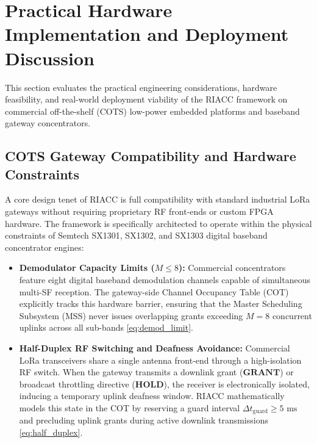 \documentclass[preprint,review,12pt]{elsarticle}
\begin{document}
\section{Practical Hardware Implementation and Deployment Discussion}
\label{sec:discussion}

This section evaluates the practical engineering considerations, hardware feasibility, and real-world deployment viability of the RIACC framework on commercial off-the-shelf (COTS) low-power embedded platforms and baseband gateway concentrators.

\subsection{COTS Gateway Compatibility and Hardware Constraints}
A core design tenet of RIACC is full compatibility with standard industrial LoRa gateways without requiring proprietary RF front-ends or custom FPGA hardware. The framework is specifically architected to operate within the physical constraints of Semtech SX1301, SX1302, and SX1303 digital baseband concentrator engines:
\begin{itemize}
    \item \textbf{Demodulator Capacity Limits ($M \le 8$):} Commercial concentrators feature eight digital baseband demodulation channels capable of simultaneous multi-SF reception. The gateway-side Channel Occupancy Table (COT) explicitly tracks this hardware barrier, ensuring that the Master Scheduling Subsystem (MSS) never issues overlapping grants exceeding $M = 8$ concurrent uplinks across all sub-bands \eqref{eq:demod_limit}.
    \item \textbf{Half-Duplex RF Switching and Deafness Avoidance:} Commercial LoRa transceivers share a single antenna front-end through a high-isolation RF switch. When the gateway transmits a downlink grant ($\textbf{GRANT}$) or broadcast throttling directive ($\textbf{HOLD}$), the receiver is electronically isolated, inducing a temporary uplink deafness window. RIACC mathematically models this state in the COT by reserving a guard interval $\Delta t_{\text{guard}} \ge 5\text{ ms}$ and precluding uplink grants during active downlink transmissions \eqref{eq:half_duplex}.
\end{itemize}
\end{document}
